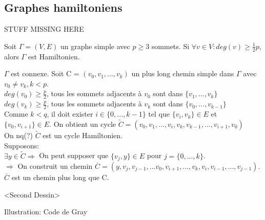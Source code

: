 \subsection{Graphes hamiltoniens}



STUFF MISSING HERE


\begin{thrm}[Dirac 1950]
Soit $\Gamma = (V,E)$ un graphe simple avec $p \geq 3$ sommets. Si $\forall v \in V: deg(v) \geq \frac{1}{2}p$, alors $\Gamma$ est Hamiltonien.
\end{thrm}

\begin{demo}
$\Gamma$ est connexe. Soit C = $(v_{0},v_{1},...,v_{k})$ un plus long chemin simple dans $\Gamma$ avec $v_{0} \neq v_{k}, k < p$.\\

$ deg(v_{0}) \geq \frac{p}{2}$, tous les sommets adjacents à $v_{0}$ sont dans $\{v_{1},...,v_{k}\}$\\

$ deg(v_{k}) \geq \frac{p}{2}$, tous les sommets adjacents à $v_{k}$ sont dans $\{v_{0},...,v_{k-1}\}$\\

Comme $k < q$, il doit exister $i \in \{0,...,k-1\}$ tel que $\{v_{i},v_{k}\} \in E$ et $\{v_{0},v_{i+1}\} \in E$. On obtient un cycle $\widetilde{C} = (v_{0},v_{1},...,v_{i},v_{k},v_{k-1},...,v_{i+1},v_{0})$ \\



On nq(?) $\widetilde{C}$ est un cycle Hamiltonien.\\

Supposons:\\

$\exists  y \in \widetilde{C} \Rightarrow$ On peut supposer que $\{ v_{j},y\} \in E$ pour $j=\{0,...,k\}$.\\

$\Rightarrow$ On construit un chemin $\overline{C} = (y, v_{j},v_{j-1},...v_{0},v_{i+1},...,v_{k},v_{i},v_{i-1},...,v_{j-1})$. $\overline{C}$ est un chemin plus long que C.

<Second Dessin>

\end{demo}

Illustration: Code de Gray

